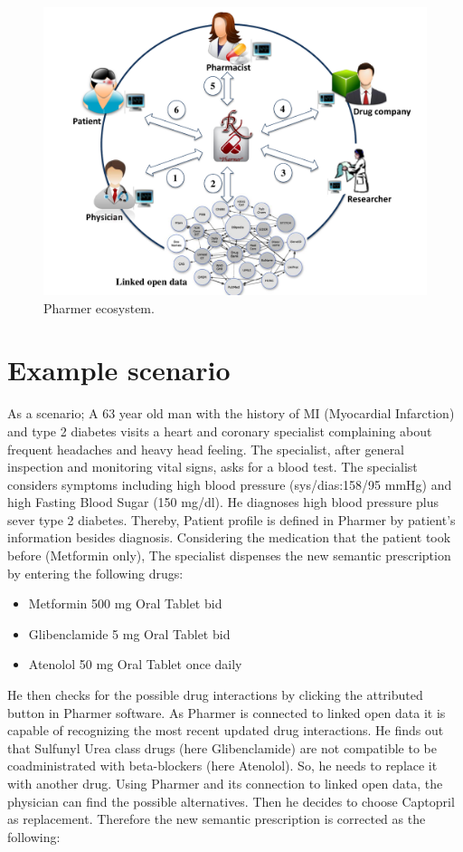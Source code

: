 \documentclass[10pt, conference, compsocconf]{IEEEtran}
\begin{document}
\begin{figure}[tb]
	\centering
		\includegraphics[width=1.0\columnwidth]{images/system.pdf}
	\caption{Pharmer ecosystem.}
	\label{fig:system}
\end{figure}

\section{Example scenario}
\label{sec:example}
As a scenario; A 63 year old man with the history of MI (Myocardial Infarction) and type 2 diabetes visits a heart and coronary specialist complaining about frequent headaches and heavy head feeling. The specialist, after general inspection and monitoring vital signs, asks for a blood test. The specialist considers symptoms including high blood pressure (sys/dias:158/95 mmHg) and high Fasting Blood Sugar (150 mg/dl). He diagnoses high blood pressure plus sever type 2 diabetes.
Thereby, Patient profile is defined in Pharmer by patient's information besides diagnosis.
Considering the medication that the patient took before (Metformin only), The specialist dispenses the new semantic prescription by entering the following drugs:

\begin{itemize}
\item {Metformin} 500 mg Oral Tablet bid
\item {Glibenclamide} 5 mg Oral Tablet bid
\item {Atenolol} 50 mg Oral Tablet once daily
\end{itemize}

He then checks for the possible drug interactions by clicking the attributed button in Pharmer software.
As Pharmer is connected to linked open data it is capable of recognizing the most recent updated drug interactions.
He finds out that Sulfunyl Urea class drugs (here Glibenclamide) are not compatible to be coadministrated with beta-blockers (here Atenolol).
So, he needs to replace it with another drug.
Using Pharmer and its connection to linked open data, the physician can find the possible alternatives.
Then he decides to choose Captopril as replacement.
Therefore the new semantic prescription is corrected as the following:
\end{document}

